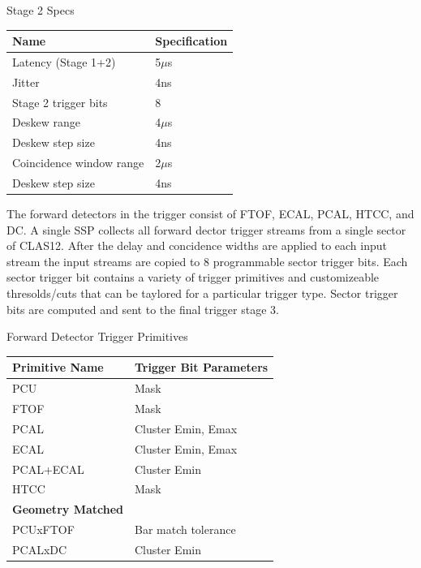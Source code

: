 \begin{center}
	Stage 2 Specs\\
	\begin{tabular}{| l | l |}
		\hline \hline
		Name				& Specification	\\
		\hline
		Latency (Stage 1+2)		& 5$\mu$s	\\
		Jitter				& 4ns		\\
		Stage 2 trigger bits		& 8		\\
		Deskew range			& 4$\mu$s	\\
		Deskew step size		& 4ns	\\
		Coincidence window range	& 2$\mu$s	\\
		Deskew step size		& 4ns	\\
		\hline \hline
	\end{tabular}
\end{center}

The forward detectors in the trigger consist of FTOF, ECAL, PCAL, HTCC, and DC. A single SSP collects all forward dector trigger streams from a single sector of CLAS12. After the delay and concidence widths are applied to each input stream the input streams are copied to 8 programmable sector trigger bits. Each sector trigger bit contains a variety of trigger primitives and customizeable thresolds/cuts that can be taylored for a particular trigger type. Sector trigger bits are computed and sent to the final trigger stage 3.

\begin{center}
	Forward Detector Trigger Primitives\\
	\begin{tabular}{| l | l |}
		\hline \hline
		Primitive Name			& Trigger Bit Parameters	\\
		\hline
		PCU     			& Mask				\\
		FTOF    			& Mask				\\
		PCAL				& Cluster Emin, Emax		\\
		ECAL				& Cluster Emin, Emax		\\
		PCAL+ECAL			& Cluster Emin			\\
		HTCC				& Mask				\\
		{\bf Geometry Matched}		&				\\
		PCUxFTOF			& Bar match tolerance		\\
		PCALxDC				& Cluster Emin			\\
		\hline \hline
	\end{tabular}
\end{center}

